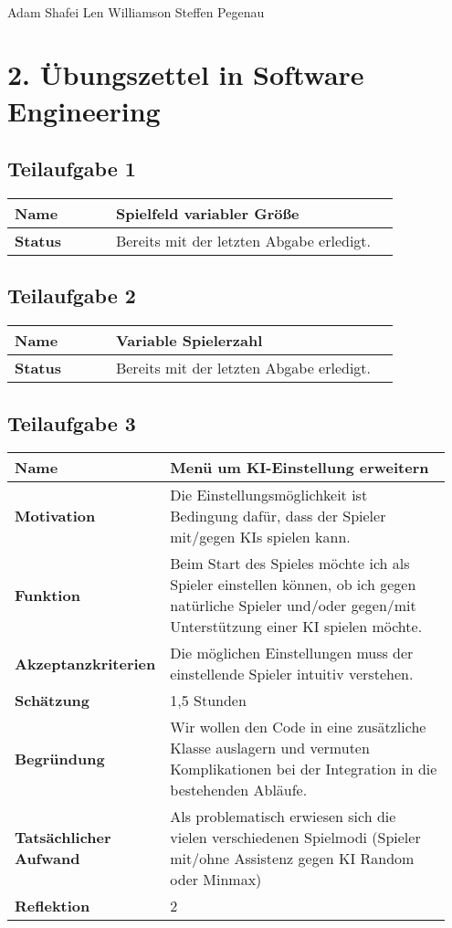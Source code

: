 \documentclass[a4paper,10pt]{article}
\begin{document}
\hfill \\
Adam Shafei \hfill Len Williamson \hfill Steffen Pegenau
\section*{2. Übungszettel in Software Engineering}
\subsection*{Teilaufgabe 1}
\begin{tabular}{|p{0.25\linewidth}|p{0.7\linewidth}|}
\hline
 \textbf{Name} & Spielfeld variabler Größe \\
 \hline
 \textbf{Status} & Bereits mit der letzten Abgabe erledigt. \\
 \hline
\end{tabular}

\subsection*{Teilaufgabe 2}
\begin{tabular}{|p{0.25\linewidth}|p{0.7\linewidth}|}
\hline
 \textbf{Name} & Variable Spielerzahl \\
 \hline
 \textbf{Status} & Bereits mit der letzten Abgabe erledigt. \\
 \hline
\end{tabular}

\subsection*{Teilaufgabe 3}
\begin{tabular}{|p{0.25\linewidth}|p{0.7\linewidth}|}
 \hline
 \textbf{\textbf{Name}} & Menü um KI-Einstellung erweitern \\
 \hline
 \textbf{Motivation} & Die Einstellungsmöglichkeit ist Bedingung dafür, dass der Spieler mit/gegen KIs spielen kann.\\
 \hline
 \textbf{Funktion} & Beim Start des Spieles möchte ich als Spieler einstellen können, ob ich gegen natürliche Spieler und/oder gegen/mit Unterstützung einer KI spielen möchte. \\
 \hline
 \textbf{Akzeptanzkriterien} & Die möglichen Einstellungen muss der einstellende Spieler intuitiv verstehen.\\
 \hline
 \textbf{Schätzung} & 1,5 Stunden\\
 \hline
 \textbf{Begründung} & Wir wollen den Code in eine zusätzliche Klasse auslagern und vermuten Komplikationen bei der Integration in die bestehenden Abläufe. \\
 \hline
 \textbf{Tatsächlicher Aufwand} & Als problematisch erwiesen sich die vielen verschiedenen Spielmodi (Spieler mit/ohne Assistenz gegen KI Random oder Minmax)\\
 \hline
 \textbf{Reflektion} & 2\\
 \hline
\end{tabular}
\end{document}
